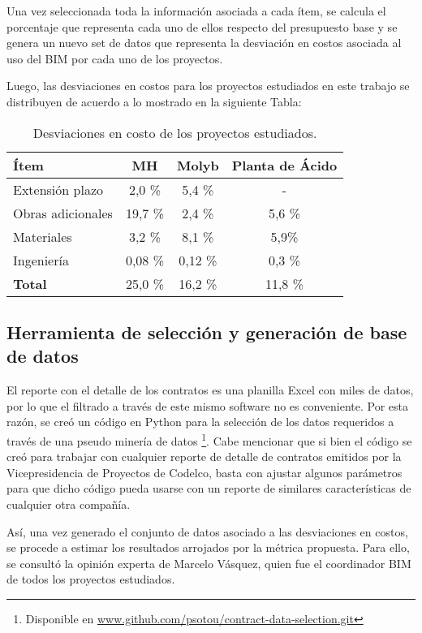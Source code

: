 Una vez seleccionada toda la información asociada a cada ítem, se calcula el porcentaje que representa cada uno de ellos respecto del presupuesto base y se genera un nuevo set de datos que representa la desviación en costos asociada al uso del BIM por cada uno de los proyectos.

Luego, las desviaciones en costos para los proyectos estudiados en este trabajo se distribuyen de acuerdo a lo mostrado en la siguiente Tabla:

\begin{table}[H]
    \centering
    \label{tab.datos_desv_proy}
    \caption{Desviaciones en costo de los proyectos estudiados.}
    \begin{tabular}{lccc}
        \toprule 
        Ítem & MH & Molyb & Planta de Ácido \\
        \midrule
        Extensión plazo & 2,0 \% & 5,4 \% & - \\
        Obras adicionales & 19,7 \% & 2,4 \% & 5,6 \%\\
        Materiales & 3,2 \% & 8,1 \% & 5,9\% \\       
        Ingeniería & 0,08 \% & 0,12 \% & 0,3 \% \\
        \textbf{Total} & 25,0 \% & 16,2 \% & 11,8 \% \\
        \bottomrule
    \end{tabular}
\end{table}

\subsection{Herramienta de selección y generación de base de datos}

El reporte con el detalle de los contratos es una planilla Excel con miles de datos, por lo que el filtrado a través de este mismo software no es conveniente. Por esta razón, se creó un código en Python para la selección de los datos requeridos a través de una pseudo minería de datos \footnote{Disponible en \url{www.github.com/psotou/contract-data-selection.git} }. Cabe mencionar que si bien el código se creó para trabajar con cualquier reporte de detalle de contratos emitidos por la Vicepresidencia de Proyectos de Codelco, basta con ajustar algunos parámetros para que dicho código pueda usarse con un reporte de similares características de cualquier otra compañía.

Así, una vez generado el conjunto de datos asociado a las desviaciones en costos, se procede a estimar los resultados arrojados por la métrica propuesta. Para ello, se consultó la opinión experta de Marcelo Vásquez, quien fue el coordinador BIM de todos los proyectos estudiados. 

